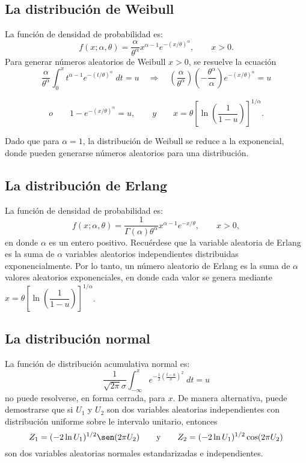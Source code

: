 \subsection{La distribución de Weibull}
La función de densidad de probabilidad es:
$$f(x;\alpha,\theta)=\dfrac{\alpha}{\theta^\alpha} x^{\alpha-1}e^{-(x/\theta)^\alpha}, \qquad x>0.$$
Para generar números aleatorios de Weibull $x>0$, se resuelve la ecuación
$$\dfrac{\alpha}{\theta^\alpha}\int_0^x t^{\alpha-1}e^{-(t/\theta)^\alpha}\; dt = u \quad \Rightarrow \quad \left(\dfrac{\alpha}{\theta^\alpha}\right)\left(-\dfrac{\theta^\alpha}{\alpha}\right)e^{-(x/\theta)^\alpha}=u$$ 
\begin{tcolorbox}
$$o\qquad 1-e^{-(x/\theta)^\alpha}=u, \qquad y \qquad x=\theta\left[\ln\left(\dfrac{1}{1-u}\right)\right]^{1/\alpha}.$$
\end{tcolorbox}
Dado que para $\alpha=1$, la distribución de Weibull se reduce a la exponencial, donde pueden generarse números aleatorios para una distribución.

\subsection{La distribución de Erlang}
La función de densidad de probabilidad es:
$$f(x;\alpha, \theta)=\dfrac{1}{\Gamma(\alpha)\theta^\alpha} x^{\alpha-1}e^{-x/\theta}, \qquad x>0,$$
en donde $\alpha$ es un entero positivo. Recuérdese que la variable aleatoria de Erlang es la suma de $\alpha$ variables aleatorios independientes distribuidas exponencialmente. Por lo tanto, un número aleatorio de Erlang es la suma de $\alpha$ valores aleatorios exponenciales, en donde cada valor se genera mediante $x=\theta\left[\ln\left(\dfrac{1}{1-u}\right)\right]^{1/\alpha}$. 

\subsection{La distribución normal}
La función de distribución acumulativa normal es:
$$\dfrac{1}{\sqrt{2\pi}\sigma}\int_{-\infty}^x e^{-\frac{1}{2}\left(\frac{t-u}{\sigma}\right)^2}\; dt = u$$
no puede resolverse, en forma cerrada, para $x$. De manera alternativa, puede demostrarse que si $U_1$ y $U_2$ son dos variables aleatorias independientes con distribución uniforme sobre le intervalo unitario, entonces
$$Z_1=(-2\ln U_1)^{1/2}\sen(2\pi U_2)\qquad \mbox{y}\qquad Z_2=(-2\ln U_1)^{1/2}\cos(2\pi U_2)$$
son dos variables aleatorias normales estandarizadas e independientes.

